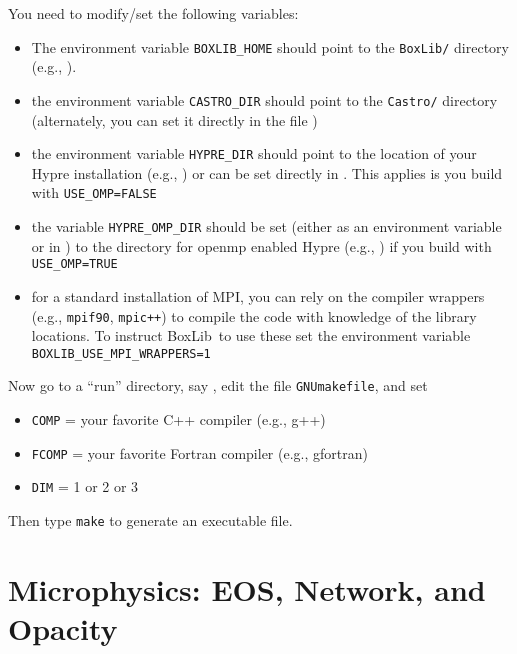 \documentclass[11pt,letterpaper]{article}
\newcommand{\boxlib}{{\sf BoxLib}}
\begin{document}
You need to modify/set the following variables:
\begin{itemize}
\item The environment variable {\tt BOXLIB\_HOME} should point to the
  {\tt BoxLib/} directory (e.g., {\tt{}}).
  
\item the environment variable {\tt CASTRO\_DIR} should
  point to the {\tt Castro/} directory (alternately,
  you can set it directly in the file
  {\tt{}})

\item the environment variable {\tt HYPRE\_DIR} should
  point to the location of your Hypre installation
  (e.g., {\tt{}}) or
  can be set directly in 
  {\tt{}}.
  This applies is you build with {\tt USE\_OMP=FALSE}

\item the variable {\tt HYPRE\_OMP\_DIR} should be set (either as an
  environment variable or in
  {\tt{}}) to the directory
  for openmp enabled Hypre (e.g.,
  {\tt{}}) if you build with {\tt
    USE\_OMP=TRUE}

\item for a standard installation of MPI, you can rely on the compiler
  wrappers (e.g., {\tt mpif90}, {\tt mpic++}) to compile the code
  with knowledge of the library locations.  To instruct \boxlib\
  to use these set the environment variable {\tt BOXLIB\_USE\_MPI\_WRAPPERS=1}
  
\end{itemize}

Now go to a ``run'' directory, say
{\tt{}},
edit the file {\tt GNUmakefile}, and set
\begin{itemize}
\item {\tt COMP} = your favorite C++ compiler (e.g., g++)
\item {\tt FCOMP} = your favorite Fortran compiler (e.g., gfortran)
\item {\tt DIM}   = 1 or 2 or 3
\end{itemize}
Then type {\tt make} to generate an executable file.

\section{Microphysics: EOS, Network, and Opacity}
\end{document}
